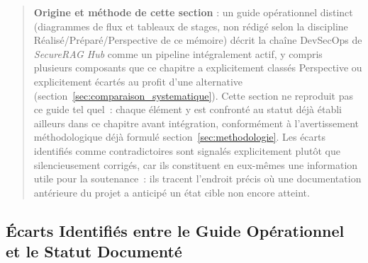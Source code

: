 \begin{quote}
\textbf{Origine et méthode de cette section} : un guide opérationnel distinct
(diagrammes de flux et tableaux de stages, non rédigé selon la discipline
Réalisé/Préparé/Perspective de ce mémoire) décrit la chaîne DevSecOps de
\textit{SecureRAG Hub} comme un pipeline intégralement actif, y compris
plusieurs composants que ce chapitre a explicitement classés Perspective ou
explicitement écartés au profit d'une alternative (section~\ref{sec:comparaison_systematique}).
Cette section ne reproduit pas ce guide tel quel~: chaque élément y est
confronté au statut déjà établi ailleurs dans ce chapitre avant intégration,
conformément à l'avertissement méthodologique déjà formulé section~\ref{sec:methodologie}.
Les écarts identifiés comme contradictoires sont signalés explicitement plutôt
que silencieusement corrigés, car ils constituent en eux-mêmes une information
utile pour la soutenance~: ils tracent l'endroit précis où une documentation
antérieure du projet a anticipé un état cible non encore atteint.
\end{quote}

\subsection{Écarts Identifiés entre le Guide Opérationnel et le Statut Documenté}
\label{sub:ecarts_guide}

